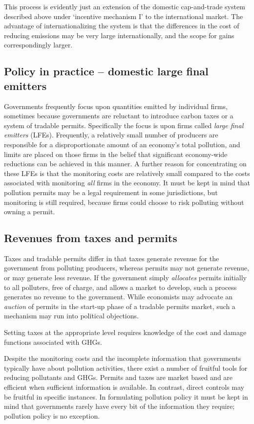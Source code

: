 This process is evidently just an extension of the domestic cap-and-trade system described above under `incentive mechanism I' to the international market. The advantage of internationalizing the system is that the differences in the cost of reducing emissions may be very large internationally, and the scope for gains correspondingly larger.

\subsection*{Policy in practice -- domestic large final emitters}

Governments frequently focus upon quantities emitted by individual firms, sometimes because governments are reluctant to introduce carbon taxes or a system of tradable permits. Specifically the focus is upon firms called \textit{large final emitters} (LFEs). Frequently, a relatively small number of producers are responsible for a disproportionate amount of an economy's total pollution, and limits are placed on those firms in the belief that significant economy-wide reductions can be achieved in this manner. A further reason for concentrating on these LFEs is that the monitoring costs are relatively small compared to the costs associated with monitoring \textit{all} firms in the economy. It must be kept in mind that pollution permits may be a legal requirement in some jurisdictions, but monitoring is still required, because firms could choose to risk polluting without owning a permit.

\subsection*{Revenues from taxes and permits}

Taxes and tradable permits differ in that taxes generate revenue for the government from polluting producers, whereas permits may not generate revenue, or may generate less revenue. If the government simply \textit{allocates} permits initially to all polluters, free of charge, and allows a market to develop, such a process generates no revenue to the government. While economists may advocate an \textit{auction} of permits in the start-up phase of a tradable permits market, such a mechanism may run into political objections.

Setting taxes at the appropriate level requires knowledge of the cost and damage functions associated with GHGs.

Despite the monitoring costs and the incomplete information that governments typically have about pollution activities, there exist a number of fruitful tools for reducing pollutants and GHGs. Permits and taxes are market based and are efficient when sufficient information is available. In contrast, direct controls may be fruitful in specific instances. In formulating pollution policy it must be kept in mind that governments rarely have every bit of the information they require; pollution policy is no exception. 